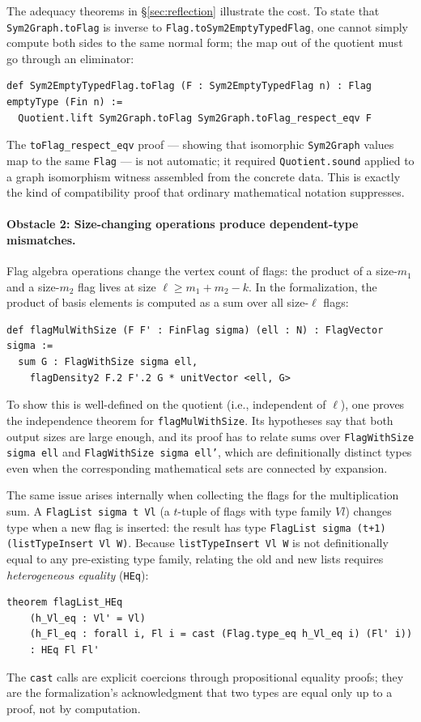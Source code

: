 \documentclass{article}
\newcommand{\lean}[1]{\texttt{#1}}
\begin{document}
The adequacy theorems in \S\ref{sec:reflection} illustrate the cost.  To state
that \lean{Sym2Graph.toFlag} is inverse to \lean{Flag.toSym2EmptyTypedFlag}, one
cannot simply compute both sides to the same normal form; the map out of the
quotient must go through an eliminator:
\begin{lstlisting}
def Sym2EmptyTypedFlag.toFlag (F : Sym2EmptyTypedFlag n) : Flag emptyType (Fin n) :=
  Quotient.lift Sym2Graph.toFlag Sym2Graph.toFlag_respect_eqv F
\end{lstlisting}
The \lean{toFlag\_respect\_eqv} proof --- showing that isomorphic \lean{Sym2Graph}
values map to the same \lean{Flag} --- is not automatic; it required
\lean{Quotient.sound} applied to a graph isomorphism witness assembled from the
concrete data.  This is exactly the kind of compatibility proof that ordinary
mathematical notation suppresses.

\paragraph{Obstacle 2: Size-changing operations produce dependent-type mismatches.}
Flag algebra operations change the vertex count of flags: the product of a
size-$m_1$ and a size-$m_2$ flag lives at size $\ell \geq m_1 + m_2 - k$.
In the formalization, the product of basis elements is computed as a sum over
all size-$\ell$ flags:
\begin{lstlisting}
def flagMulWithSize (F F' : FinFlag sigma) (ell : N) : FlagVector sigma :=
  sum G : FlagWithSize sigma ell,
    flagDensity2 F.2 F'.2 G * unitVector <ell, G>
\end{lstlisting}
To show this is well-defined on the quotient (i.e., independent of $\ell$),
one proves the independence theorem for \lean{flagMulWithSize}.  Its
hypotheses say that both output sizes are large enough, and its proof has to
relate sums over
\lean{FlagWithSize sigma ell} and \lean{FlagWithSize sigma ell'}, which are
definitionally distinct types even when the corresponding mathematical sets are
connected by expansion.

The same issue arises internally when collecting the flags for the multiplication
sum.  A \lean{FlagList sigma t Vl} (a $t$-tuple of flags with type family $Vl$)
changes type when a new flag is inserted: the result has type
\lean{FlagList sigma (t+1) (listTypeInsert Vl W)}.  Because
\lean{listTypeInsert Vl W} is not definitionally equal to any pre-existing type
family, relating the old and new lists requires \emph{heterogeneous equality}
(\lean{HEq}):
\begin{lstlisting}
theorem flagList_HEq
    (h_Vl_eq : Vl' = Vl)
    (h_Fl_eq : forall i, Fl i = cast (Flag.type_eq h_Vl_eq i) (Fl' i))
    : HEq Fl Fl'
\end{lstlisting}
The \lean{cast} calls are explicit coercions through propositional equality proofs;
they are the formalization's acknowledgment that two types are equal only up to a
proof, not by computation.
\end{document}
